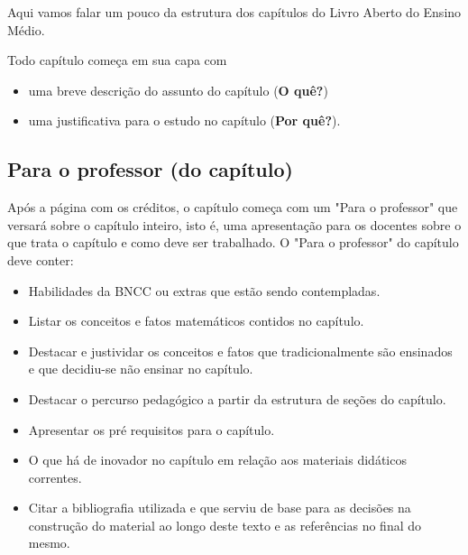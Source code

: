 


Aqui vamos falar um pouco da estrutura dos capítulos do Livro Aberto do Ensino Médio.

Todo capítulo começa em sua capa com 

\begin{itemize}
\item uma breve descrição do assunto do capítulo (\textbf{O quê?})
\item uma justificativa para o estudo no capítulo (\textbf{Por quê?}).
\end{itemize} 

\subsection{Para o professor (do capítulo)}
Após a página com os créditos, o capítulo começa com um "Para o professor" que versará sobre o capítulo inteiro, isto é, uma apresentação para os docentes sobre o que trata o capítulo e como deve ser trabalhado. O "Para o professor" do capítulo deve conter:

\begin{itemize}
\item Habilidades da BNCC ou extras que estão sendo contempladas.
\item Listar os conceitos e fatos matemáticos contidos no capítulo.
\item Destacar e justividar os conceitos e fatos que tradicionalmente são ensinados e que decidiu-se não ensinar no capítulo.
\item Destacar o percurso pedagógico a partir da estrutura de seções do capítulo.
\item Apresentar os pré requisitos para o capítulo.
\item O que há de inovador no capítulo em relação aos materiais didáticos correntes.
\item Citar a bibliografia utilizada e que serviu de base para as decisões na construção do material ao longo deste texto e as referências no final do mesmo.
\end{itemize}

